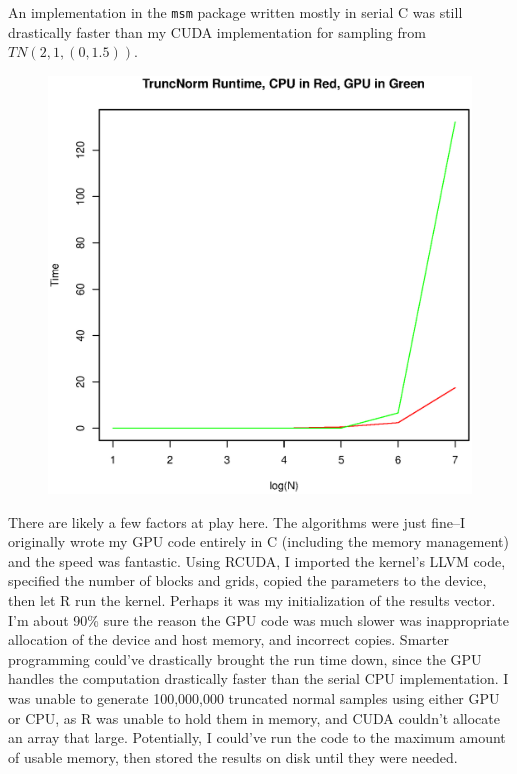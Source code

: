 \documentclass[12pt]{article}
\begin{document}
An implementation in the \verb+msm+ package written mostly in serial C was still drastically faster than my CUDA implementation for sampling from $TN(2,1, (0, 1.5))$.
\begin{figure}[H] \center
\includegraphics[scale=.60]{TruncNorm/TruncNorm_Timings}
\end{figure}
There are likely a few factors at play here. The algorithms were just fine--I originally wrote my GPU code entirely in C (including the memory management) and the speed was fantastic. Using RCUDA, I imported the kernel's LLVM code, specified the number of blocks and grids, copied the parameters to the device, then let R run the kernel. Perhaps it was my initialization of the results vector. I'm about 90\% sure the reason the GPU code was much slower was inappropriate allocation of the device and host memory, and incorrect copies. Smarter programming could've drastically brought the run time down, since the GPU handles the computation drastically faster than the serial CPU implementation. I was unable to generate 100,000,000 truncated normal samples using either GPU or CPU, as R was unable to hold them in memory, and CUDA couldn't allocate an array that large. Potentially, I could've run the code to the maximum amount of usable memory, then stored the results on disk until they were needed.
\end{document}
